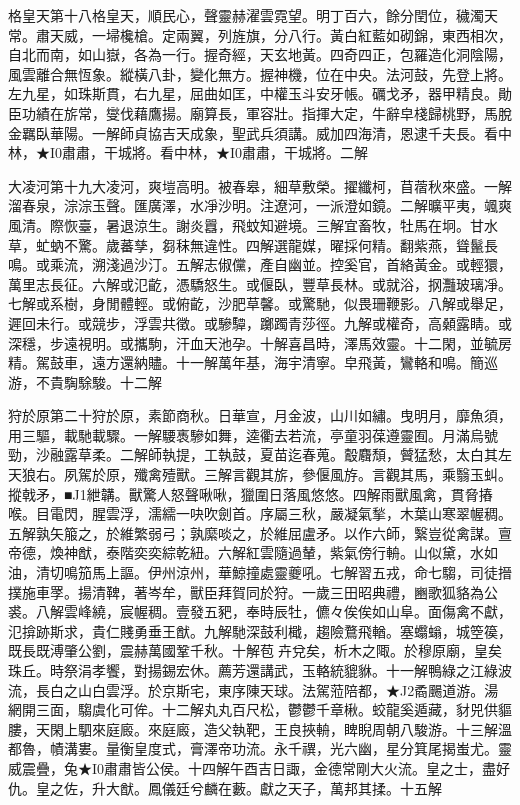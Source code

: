 \begin{pinyinscope}
格皇天第十八格皇天，順民心，聲靈赫濯雲霓望。明丁百六，餘分閏位，穢濁天常。肅天威，一埽欃槍。定兩翼，列旌旗，分八行。黃白紅藍如砌錦，東西相次，自北而南，如山嶽，各為一行。握奇經，天玄地黃。四奇四正，包羅造化洞陰陽，風雲離合無恆象。縱橫八卦，變化無方。握神機，位在中央。法河鼓，先登上將。左九星，如珠斯貫，右九星，屈曲如匡，中權玉斗安牙帳。礪戈矛，器甲精良。勛臣功績在旂常，燮伐藉鷹揚。廟算長，軍容壯。指揮大定，牛辭皁棧歸桃野，馬脫金羈臥華陽。一解師貞協吉天成象，聖武兵須講。威加四海清，恩逮千夫長。看中林，★I0肅肅，干城將。看中林，★I0肅肅，干城將。二解

大凌河第十九大凌河，爽塏高明。被春皋，細草敷榮。擢纖柯，苜蓿秋來盛。一解溜春泉，淙淙玉聲。匯廣澤，水凈沙明。注遼河，一派澄如鏡。二解曠平夷，颯爽風清。際恢臺，暑退涼生。謝炎囂，飛蚊知避境。三解宜畜牧，牡馬在坰。甘水草，虻蚋不驚。歲蕃孳，芻秣無違性。四解選龍媒，曜採何精。翻紫燕，聳鬣長鳴。或乘流，溯淺過沙汀。五解志俶儻，產自幽並。控奚官，首絡黃金。或輕獧，萬里志長征。六解或氾齕，憑驕怒生。或偃臥，豐草長林。或就浴，㧏灩玻璃凈。七解或系樹，身閒體輕。或俯齕，沙肥草馨。或驚馳，似畏珊鞭影。八解或舉足，遲回未行。或競步，浮雲共徵。或驂驔，躑躅青莎徑。九解或權奇，高顙露睛。或深穩，步遠視明。或攜駒，汗血天池孕。十解喜昌時，澤馬效靈。十二閑，並毓房精。駕鼓車，遠方還納贐。十一解萬年基，海宇清寧。皁飛黃，鸞輅和鳴。簡巡游，不貴騊駼駿。十二解

狩於原第二十狩於原，素節商秋。日華宣，月金波，山川如繡。曳明月，靡魚須，用三驅，載馳載驟。一解騕褭驂如舞，逵衢去若流，亭童羽葆遵靈囿。月滿烏號勁，沙融露草柔。二解師執提，工執鼓，夏苗迄春蒐。鷇麛頹，贙猛愁，太白其左天狼右。夙駕於原，殲禽殪獸。三解言觀其旂，參偃風斿。言觀其馬，乘翳玉虯。摐戟矛，■J1紲韝。獸驚人怒聲啾啾，獵圍日落風悠悠。四解雨獸風禽，貫脅摏喉。目電閃，腥雲浮，濡繻一吷吹劍首。序屬三秋，嚴凝氣揫，木葉山寒翠幄稠。五解孰矢箙之，於維繁弱弓；孰縻啖之，於維屈盧矛。以作六師，繄豈從禽謀。亶帝德，煥神猷，泰階奕奕綜乾紐。六解紅雲隨過輦，紫氣傍行輈。山似黛，水如油，清切鳴笳馬上謳。伊州涼州，華鯨撞處靈夔吼。七解習五戎，命七騶，司徒搢撲施車罦。揚清鞞，著岑牟，獸臣拜賀同於狩。一歲三田昭典禮，豳歌狐貉為公裘。八解雲峰繞，宸幄稠。壹發五豝，奉時辰牡，儦々俟俟如山阜。面傷禽不獻，氾揜跡斯求，貴仁賤勇垂王猷。九解馳深鼓利檝，趨險鶩飛輶。塞蠮螉，城箜篌，既長既溥肇公劉，震赫萬國鞏千秋。十解苞卉兌矣，析木之陬。於穆原廟，皇矣珠丘。時祭涓孝饗，對揚錫宏休。薦芳還講武，玉輅統貔貅。十一解鴨綠之江綠波流，長白之山白雲浮。於京斯宅，東序陳天球。法駕蒞陪都，★J2矞颺道游。湯網開三面，騶虞化可侔。十二解丸丸百尺松，鬱鬱千章楸。蛟龍奚遁藏，豺兕供貙膢，天閑上駟來庭廄。來庭廄，造父執靶，王良挾輈，睥睨周朝八駿游。十三解溫都魯，幘溝婁。量衡皇度式，膏澤帝功流。永千禩，光六幽，星分箕尾揭蚩尤。靈威震疊，兔★I0肅肅皆公侯。十四解午酉吉日諏，金德常剛大火流。皇之士，盡好仇。皇之佐，升大猷。鳳儀廷兮麟在藪。獻之天子，萬邦其揉。十五解


\end{pinyinscope}
